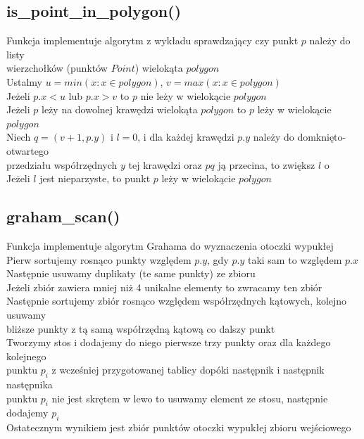 \documentclass{article}
\begin{document}
\subsection{is\_point\_in\_polygon()}
Funkcja implementuje algorytm z wykładu sprawdzający czy punkt $p$ należy do listy \\wierzchołków (punktów $Point$) wielokąta $polygon$ \\ Ustalmy $u = min(x : x \in polygon)$, $v = max(x : x \in polygon)$ \\ Jeżeli $p.x < u$ lub $p.x > v$ to $p$ nie leży w wielokącie $polygon$ \\ Jeżeli $p$ leży na dowolnej krawędzi wielokąta $polygon$ to $p$ leży w wielokącie $polygon$\\Niech $q = (v + 1, p.y)$ i $l = 0$, i dla każdej krawędzi $p.y$ należy do domknięto-otwartego \\przedziału współrzędnych $y$ tej krawędzi oraz $pq$ ją przecina, to zwiększ $l$ o \\ Jeżeli $l$ jest nieparzyste, to punkt $p$ leży w wielokącie $polygon$  


\subsection{graham\_scan()}
Funkcja implementuje algorytm Grahama do wyznaczenia otoczki wypukłej \\ Pierw sortujemy rosnąco punkty względem $p.y$, gdy $p.y$ taki sam to względem $p.x$ \\ Następnie usuwamy duplikaty (te same punkty) ze zbioru \\ Jeżeli zbiór zawiera mniej niż 4 unikalne elementy to zwracamy ten zbiór \\ Następnie sortujemy zbiór rosnąco względem współrzędnych kątowych, kolejno usuwamy \\ bliższe punkty z tą samą współrzędną kątową co dalszy punkt \\ Tworzymy stos i dodajemy do niego pierwsze trzy punkty oraz dla każdego kolejnego \\ punktu $p_i$ z wcześniej przygotowanej tablicy dopóki następnik i następnik następnika \\ punktu $p_i$ nie jest skrętem w lewo to usuwamy element ze stosu, następnie dodajemy $p_i$ \\ Ostatecznym wynikiem jest zbiór punktów otoczki wypukłej zbioru wejściowego 

\end{document}
